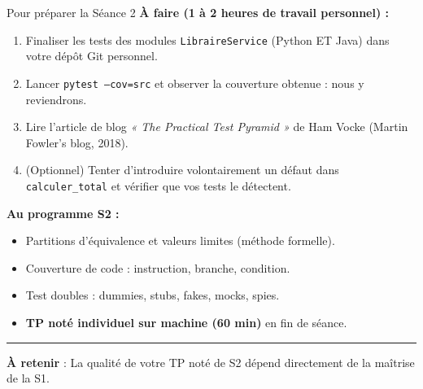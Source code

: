 \documentclass[aspectratio=169,11pt]{beamer}
\newcommand{\takeaway}[1]{%
\vfill\begin{beamercolorbox}[wd=\linewidth,sep=0.4em]{}
\color{accent2}\rule[0.6ex]{1.2em}{1.2pt}\hspace{0.4em}%
\textbf{\color{accent2}\small À retenir} \textcolor{textsoft}{:} %
{\small\color{textmain}#1}
\end{beamercolorbox}}
\begin{document}
\begin{frame}[t]{Pour préparer la Séance 2}
\footnotesize
\textbf{À faire (1 à 2 heures de travail personnel) :}\\[0.4em]
\begin{enumerate}\itemsep0.18em
\item Finaliser les tests des modules \texttt{LibraireService} (Python ET Java) dans votre dépôt Git personnel.
\item Lancer \texttt{pytest --cov=src} et observer la couverture obtenue : nous y reviendrons.
\item Lire l'article de blog \textit{« The Practical Test Pyramid »} de Ham Vocke (Martin Fowler's blog, 2018).
\item (Optionnel) Tenter d'introduire volontairement un défaut dans \texttt{calculer\_total} et vérifier que vos tests le détectent.
\end{enumerate}
\vspace{0.4cm}
\textbf{Au programme S2 :}
\begin{itemize}\itemsep0.1em
\item Partitions d'équivalence et valeurs limites (méthode formelle).
\item Couverture de code : instruction, branche, condition.
\item Test doubles : dummies, stubs, fakes, mocks, spies.
\item \textbf{TP noté individuel sur machine (60 min)} en fin de séance.
\end{itemize}
\takeaway{La qualité de votre TP noté de S2 dépend directement de la maîtrise de la S1.}
\end{frame}
\end{document}
